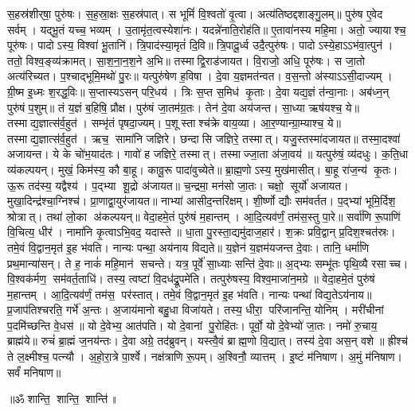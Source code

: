 

स॒हस्र॑शीर्‌षा॒ पुरु॑षः। 
स॒ह॒स्रा॒क्षः स॒हस्र॑पात्। 
स भूमिं॑ वि॒श्वतो॑ वृ॒त्वा। 
अत्य॑तिष्ठद्दशाङ्गु॒लम्॥ 
% 
पुरु॑ष ए॒वेद सर्वम्। 
यद्भू॒तं यच्च॒ भव्यम्। 
उ॒तामृ॑त॒त्वस्येशा॑नः। 
यदन्ने॑नाति॒रोह॑ति॥ 
% 
ए॒तावा॑नस्य महि॒मा। 
अतो॒ ज्यायाश्च॒ पूरु॑षः। 
पादोऽस्य॒ विश्वा॑ भू॒तानि॑। 
त्रि॒पाद॑स्या॒मृतं॑ दि॒वि॥ 
% 
त्रि॒पादू॒र्ध्व उदै॒त्पुरु॑षः। 
पादोऽस्ये॒हाऽऽभ॑वा॒त्पुन॑। 
ततो॒ विश्व॒ङ्व्य॑क्रामत्। 
सा॒श॒ना॒न॒श॒ने अ॒भि॥ 
% 
तस्माद्वि॒राड॑जायत। 
वि॒राजो॒ अधि॒ पूरु॑षः। 
स जा॒तो अत्य॑रिच्यत। 
प॒श्चाद्भूमि॒मथो॑ पु॒रः॥ 
% 
 यत्पुरु॑षेण ह॒विषा। 
दे॒वा य॒ज्ञमत॑न्वत। 
व॒स॒न्तो अ॑स्याऽऽसी॒दाज्यम्। 
ग्री॒ष्म इ॒ध्मः श॒रद्ध॒विः॥ 
% 
 स॒प्तास्यऽ\sav{}सन्  परि॒धय॑। 
त्रिः स॒प्त स॒मिध॑ कृ॒ताः। 
दे॒वा यद्य॒ज्ञं त॑न्वा॒नाः। 
अब॑ध्न॒न् पुरु॑षं प॒शुम्॥ 
% 
 तं य॒ज्ञं ब॒\ar हिषि॒ प्रौक्ष\sn। 
पुरु॑षं जा॒तम॑ग्र॒तः। 
तेन॑ दे॒वा अय॑जन्त। 
सा॒ध्या ऋष॑यश्च॒ ये॥ 
% 
तस्माद्य॒ज्ञात्स॑र्व॒हुत॑। 
सम्भृ॑तं पृषदा॒ज्यम्। 
प॒शूस्ताश्च॑क्रे वाय॒व्या\sn{}। 
आ॒र॒ण्यान्ग्रा॒म्याश्च॒ ये॥ 
% 
 तस्माद्य॒ज्ञात्स॑र्व॒हुत॑। 
ऋच॒ सामा॑नि जज्ञिरे। 
छन्दासि जज्ञिरे॒ तस्मात्। 
यजु॒स्तस्मा॑दजायत॥ 
% 
तस्मा॒दश्वा॑ अजायन्त। 
ये के चो॑भ॒याद॑तः। 
गावो॑ ह जज्ञिरे॒ तस्मात्। 
तस्माज्जा॒ता अ॑जा॒वय॑॥ 
% 
यत्पुरु॑षं॒ व्य॑दधुः। 
क॒ति॒धा व्य॑कल्पयन्। 
मुखं॒ किम॑स्य॒ कौ बा॒हू। 
कावू॒रू पादा॑वुच्येते॥ 
% 
ब्रा॒ह्म॒णोऽस्य॒ मुख॑मासीत्। 
बा॒हू रा॑ज॒न्य॑ कृ॒तः। 
ऊ॒रू तद॑स्य॒ यद्वैश्य॑। 
प॒द्भ्या शू॒द्रो अ॑जायत॥ 
% 
च॒न्द्रमा॒ मन॑सो जा॒तः। 
चक्षो॒ सूर्यो॑ अजायत। 
मुखा॒दिन्द्र॑श्चा॒ग्निश्च॑। 
प्रा॒णाद्वा॒युर॑जायत॥ 
% 
नाभ्या॑ आसीद॒न्तरि॑क्षम्। 
शी॒र्ष्णो द्यौः सम॑वर्तत। 
प॒द्भ्यां भूमि॒र्दिश॒ श्रोत्रात्। 
तथा॑ लो॒का अ॑कल्पयन्॥ 
% 
वेदा॒हमे॒तं पुरु॑षं म॒हान्तम्। 
आ॒दि॒त्यव॑र्णं॒ तम॑स॒स्तु पा॒रे॥ 
% 
सर्वा॑णि रू॒पाणि॑ वि॒चित्य॒ धीर॑। 
नामा॑नि कृ॒त्वाऽभि॒वद॒\an{} यदास्ते॥ 
% 
धा॒ता पु॒रस्ता॒द्यमु॑दाज॒हार॑। 
श॒क्रः प्रवि॒द्वान्  प्र॒दिश॒श्चत॑स्रः। 
तमे॒वं वि॒द्वान॒मृत॑ इ॒ह भ॑वति। 
नान्यः पन्था॒ अय॑नाय विद्यते॥ 
% 
य॒ज्ञेन॑ य॒ज्ञम॑यजन्त दे॒वाः। 
तानि॒ धर्मा॑णि प्रथ॒मान्या॑सन्। 
ते ह॒ नाकं॑ महि॒मान॑ सचन्ते। 
यत्र॒ पूर्वे॑ सा॒ध्याः सन्ति॑ दे॒वाः॥ 
% 
अ॒द्भ्यः सम्भू॑तः पृथि॒व्यै रसाच्च। 
वि॒श्वक॑र्मण॒ सम॑वर्त॒ताधि॑। 
तस्य॒ त्वष्टा॑ वि॒दध॑द्रू॒पमे॑ति। 
तत्पुरु॑षस्य॒ विश्व॒माजा॑न॒मग्रे॥ 
% 
वेदा॒हमे॒तं पुरु॑षं म॒हान्तम्। 
आ॒दि॒त्यव॑र्णं॒ तम॑स॒ पर॑स्तात्। 
तमे॒वं वि॒द्वान॒मृत॑ इ॒ह भ॑वति। 
नान्यः पन्था॑ विद्य॒तेऽय॑नाय॥ 
% 
प्र॒जाप॑तिश्चरति॒ गर्भे॑ अ॒न्तः। 
अ॒जाय॑मानो बहु॒धा विजा॑यते। 
तस्य॒ धीरा॒ परि॑जानन्ति॒ योनिम्। 
मरी॑चीनां प॒दमि॑च्छन्ति वे॒धस॑॥ 
% 
यो दे॒वेभ्य॒ आत॑पति। 
यो दे॒वानां पु॒रोहि॑तः। 
पूर्वो॒ यो दे॒वेभ्यो॑ जा॒तः। 
नमो॑ रु॒चाय॒ ब्राह्म॑ये॥ 
% 
रुचं॑ ब्रा॒ह्मं ज॒नय॑न्तः। 
दे॒वा अग्रे॒ तद॑ब्रुवन्। 
यस्त्वै॒वं ब्राह्म॒णो वि॒द्यात्। 
तस्य॑ दे॒वा अस॒न् वशे॥ 
% 
ह्रीश्च॑ ते ल॒क्ष्मीश्च॒ पत्न्यौ। 
अ॒हो॒रा॒त्रे पा॒र्श्वे। 
नक्ष॑त्राणि रू॒पम्। 
अ॒श्विनौ॒ व्यात्तम्। 
इ॒ष्टं म॑निषाण। 
अ॒मुं म॑निषाण। 
सर्वं॑ मनिषाण॥ 
% 


\centerline{॥ॐ शान्ति॒ शान्ति॒ शान्ति॑॥}